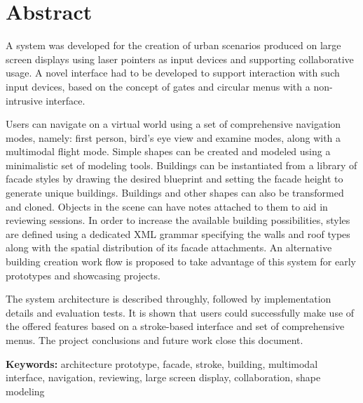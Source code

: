 \chapter*{Abstract}





A system was developed for the creation of urban scenarios produced on large screen displays
using laser pointers as input devices and supporting collaborative usage.
A novel interface had to be developed to support interaction with such input devices,
based on the concept of gates and circular menus with a non-intrusive interface.



Users can navigate on a virtual world using a set of comprehensive navigation modes, namely:
first person, bird's eye view and examine modes, along with a multimodal flight mode.
Simple shapes can be created and modeled using a minimalistic set of modeling tools.
Buildings can be instantiated from a library of facade styles by drawing
the desired blueprint and setting the facade height to generate unique buildings.
Buildings and other shapes can also be transformed and cloned.
Objects in the scene can have notes attached to them to aid in reviewing sessions.
In order to increase the available building possibilities, styles are defined using a dedicated XML grammar
specifying the walls and roof types along with the spatial distribution of its facade attachments.
An alternative building creation work flow is proposed to take advantage of this system for early prototypes
and showcasing projects.

The system architecture is described throughly, followed by implementation details and evaluation tests.
It is shown that users could successfully make use of the offered features based on a stroke-based
interface and set of comprehensive menus. 
The project conclusions and future work close this document.







\textbf{Keywords:} architecture prototype, facade, stroke, building, multimodal interface, navigation, reviewing, large screen display, collaboration, shape modeling
